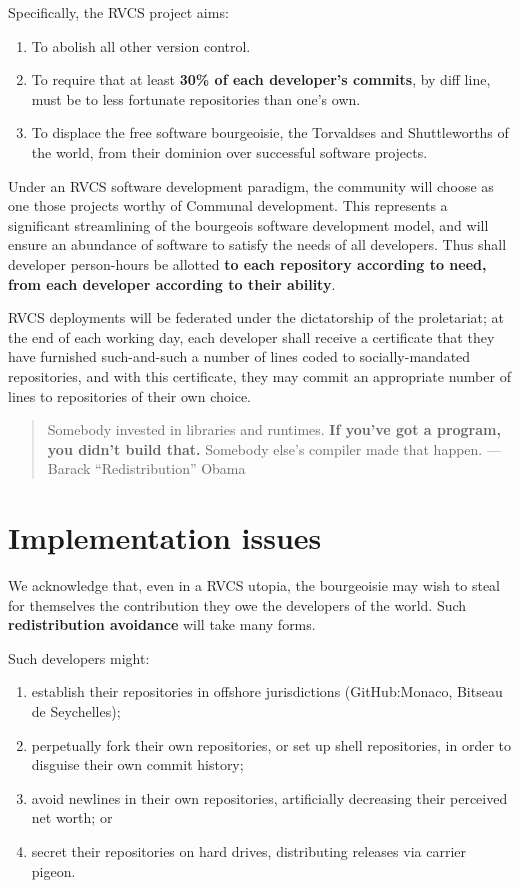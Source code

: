 \documentclass[10pt]{article}
\begin{document}
Specifically, the RVCS project aims:
\begin{enumerate}
\item To abolish all other version control.
\item To require that at least \textbf{30\% of each developer's commits}, by
diff line, must be to less fortunate repositories than one's own.
\item To displace the free software bourgeoisie, the Torvaldses and
Shuttleworths of the world, from their dominion over successful software
projects.
\end{enumerate}

Under an RVCS software development paradigm, the community will choose as one
those projects worthy of Communal development. This represents a significant
streamlining of the bourgeois software development model, and will ensure an
abundance of software to satisfy the needs of all developers. Thus shall
developer person-hours be allotted \textbf{to each repository according to need,
from each developer according to their ability}.

RVCS deployments will be federated under the dictatorship of the proletariat; at
the end of each working day, each developer shall receive a certificate that
they have furnished such-and-such a number of lines coded to socially-mandated
repositories, and with this certificate, they may commit an appropriate number
of lines to repositories of their own choice.

\begin{quote}
Somebody invested in libraries and runtimes. \textbf{If you've got a program,
you didn't build that.} Somebody else's compiler made that happen.%
\hfill ---Barack ``Redistribution'' Obama
\end{quote}

\section{Implementation issues}

We acknowledge that, even in a RVCS utopia, the bourgeoisie may wish to steal
for themselves the contribution they owe the developers of the world. Such
\textbf{redistribution avoidance} will take many forms.

Such developers might:
\begin{enumerate}
\item establish their repositories in offshore jurisdictions (GitHub:Monaco,
Bitseau de Seychelles);
\item perpetually fork their own repositories, or set up shell repositories, in
order to disguise their own commit history;
\item avoid newlines in their own repositories, artificially decreasing their
perceived net worth; or
\item secret their repositories on hard drives, distributing releases via
carrier pigeon.
\end{enumerate}
\end{document}
